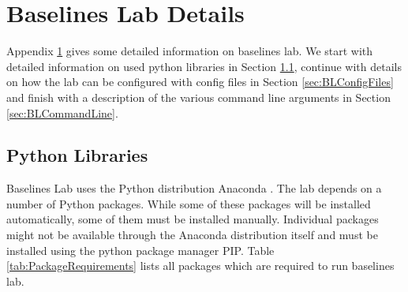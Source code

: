 \chapter{Baselines Lab Details} \label{apx:BaselinesLab}
Appendix \ref{apx:BaselinesLab} gives some detailed information on baselines lab. We start with detailed information on used python libraries in Section \ref{sec:BLLibraries}, continue with details on how the lab can be configured with config files in Section \ref{sec:BLConfigFiles} and finish with a description of the various command line arguments in Section \ref{sec:BLCommandLine}.

\section{Python Libraries} \label{sec:BLLibraries}
Baselines Lab uses the Python distribution Anaconda \cite{anaconda}. The lab depends on a number of Python packages. While some of these packages will be installed automatically, some of them must be installed manually. Individual packages might not be available through the Anaconda distribution itself and must be installed using the python package manager PIP. Table \ref{tab:PackageRequirements} lists all packages which are required to run baselines lab.

